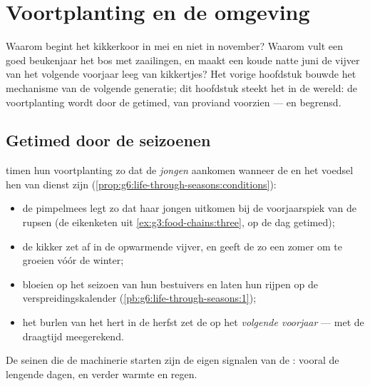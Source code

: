 \chapter{Voortplanting en de omgeving}\label{ch:g8:reproduction-and-environment}

Waarom begint het kikkerkoor in mei en niet in november? Waarom vult een
goed beukenjaar het bos met zaailingen, en maakt een koude natte juni de
vijver van het volgende voorjaar leeg van kikkertjes? Het vorige hoofdstuk
bouwde het mechanisme van de volgende generatie; dit hoofdstuk steekt het
in de wereld: de voortplanting wordt door de  getimed, van
proviand voorzien --- en begrensd.

\section{Getimed door de seizoenen}

\begin{proposition}\label{prop:g8:reproduction-and-environment:timing}
 timen hun voortplanting zo dat de \emph{jongen} aankomen wanneer
de  en het voedsel hen van dienst zijn
(\cref{prop:g6:life-through-seasons:conditions}):
\begin{itemize}
  \item de pimpelmees legt zo dat haar jongen uitkomen bij de
        voorjaarspiek van de rupsen (de eikenketen uit
        \cref{ex:g3:food-chains:three}, op de dag getimed);
  \item de kikker zet af in de opwarmende vijver, en geeft de
         zo een zomer om te groeien vóór de winter;
  \item {} bloeien op het seizoen van hun bestuivers en laten hun
         rijpen op de verspreidingskalender
        (\cref{pb:g6:life-through-seasons:1});
  \item het burlen van het hert in de herfst zet de  op het
        \emph{volgende voorjaar} --- met de draagtijd meegerekend.
\end{itemize}
De seinen die de machinerie starten zijn de eigen signalen van de
: vooral de lengende dagen, en verder warmte en regen.
\end{proposition}
\admitted

